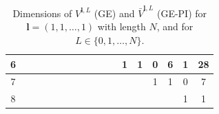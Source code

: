\documentclass{article}
\newcommand{\bV}{{\bar V}}
\numberwithin{equation}{section}
\def\bl{{\bm l}}
\def\Nat{{N}}
\begin{document}
\begin{table}[h]
{\begin{tabular}{|c|cc|cc|cc|cc|cc|cc|cc|cc|}
6 &
 \multicolumn{1}{c|}{} &
  &
 \multicolumn{1}{c|}{} &
  &
 \multicolumn{1}{c|}{} &
  &
 \multicolumn{1}{c|}{} &
  &
 \multicolumn{1}{c|}{} &
  &
 \multicolumn{1}{c|}{1} &
 1 &
 \multicolumn{1}{c|}{0} &
 6 &
 \multicolumn{1}{c|}{1} &
 28 \\ \hline
7 &
 \multicolumn{1}{c|}{} &
  &
 \multicolumn{1}{c|}{} &
  &
 \multicolumn{1}{c|}{} &
  &
 \multicolumn{1}{c|}{} &
  &
 \multicolumn{1}{c|}{} &
  &
 \multicolumn{1}{c|}{} &
  &
 \multicolumn{1}{c|}{1} &
 1 &
 \multicolumn{1}{c|}{0} &
 7 \\ \hline
8 &
 \multicolumn{1}{c|}{} &
  &
 \multicolumn{1}{c|}{} &
  &
 \multicolumn{1}{c|}{} &
  &
 \multicolumn{1}{c|}{} &
  &
 \multicolumn{1}{c|}{} &
  &
 \multicolumn{1}{c|}{} &
  &
 \multicolumn{1}{c|}{} &
  &
 \multicolumn{1}{c|}{1} &
 1 \\ \hline
\end{tabular}
}
\caption{Dimensions of $V^{\bl,L}$ (GE) and $\bV^{\bl,L}$ (GE-PI) for $\bl = (1,1,\ldots,1)$ with length $\Nat$, and for $L\in\{0,1,\ldots,\Nat\}$.}
\label{tab:l1}
\end{table}
\end{document}
